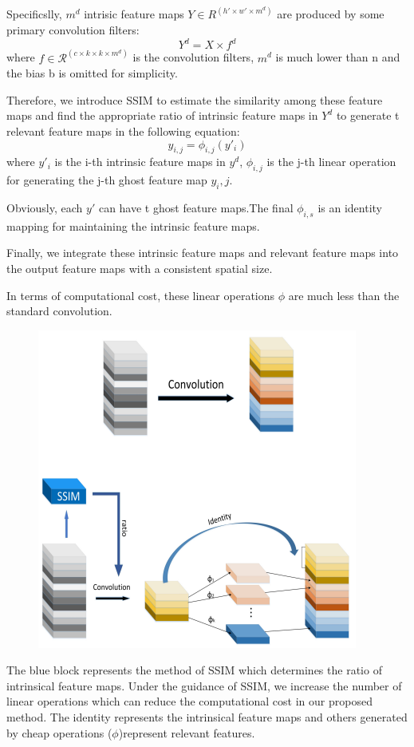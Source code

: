 \documentclass[11pt]{article}
\begin{document}
Specificslly, $m^d$ intrisic feature maps $Y \in R^{(h'\times w'\times m^d)}$ are produced by some primary convolution filters:
$$Y^d = X\times f^d$$
where $f\in \mathcal{R}^{(c\times k\times k\times m^d)}$ is the convolution filters, $m^d$ is much lower than n and the bias b is omitted for simplicity.

Therefore, we introduce SSIM to estimate the similarity among these feature maps and find the appropriate ratio of intrinsic feature maps in $Y^d$ to generate t relevant feature maps in the following equation:
$$y_{i,j} = \phi_{i,j}(y'_i)$$
where $y'_i$ is the i-th intrinsic feature maps in $y^d$, $\phi_{i,j}$ is the j-th linear operation for generating the j-th ghost feature map $y_i,j$.

Obviously, each $y'$ can have t ghost feature maps.The final $\phi_{i,s}$ is an identity mapping for maintaining the intrinsic feature maps.

Finally, we integrate these intrinsic feature maps and relevant feature maps into the output feature maps with a consistent spatial size.

In terms of computational cost, these linear operations $\phi$ are much less than the standard convolution.

\begin{figure}[H]
	\centering
	\includegraphics[scale = 0.5]{79}
\end{figure}

The blue block represents the method of SSIM which determines the ratio of intrinsical feature
maps. Under the guidance of SSIM, we increase the number of linear operations which can reduce the computational cost in our proposed method. The identity represents the intrinsical feature maps and others generated by cheap operations ($\phi$)represent relevant features.
\end{document}
